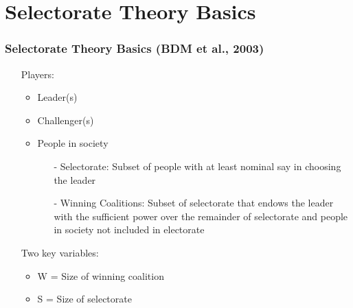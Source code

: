 \documentclass[10pt,handout]{beamer}
\begin{document}
\section{Selectorate Theory Basics}
\begin{frame}
\frametitle{Selectorate Theory Basics (BDM et al., 2003)}
\begin{itemize}
    \item[] Players: 
    \begin{itemize}
        \item Leader(s)
        \item Challenger(s)
        \item People in society
        \begin{itemize}
            \item[-] Selectorate: Subset of people with at least nominal say in choosing the leader
            \item[-] Winning Coalitions: Subset of selectorate that endows the leader with the sufficient power over the remainder of selectorate and people in society not included in electorate 
        \end{itemize}
    \end{itemize}
    \item[] Two key variables:
    \begin{itemize}
        \item W = Size of winning coalition
        \item S = Size of selectorate 
    \end{itemize}
\end{itemize}
\end{frame}
\end{document}

